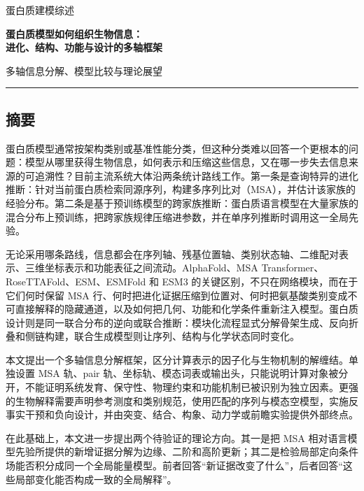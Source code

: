 \documentclass[10pt]{article}
\begin{document}
\begin{titlepage}
\vspace*{25mm}
{\color{gray}\large 蛋白质建模综述\par}
\vspace{16mm}
{\bfseries\fontsize{24}{34}\selectfont
蛋白质模型如何组织生物信息：\\[5mm]
进化、结构、功能与设计的多轴框架\par}
\vspace{13mm}
{\Large 多轴信息分解、模型比较与理论展望\par}
\vfill
\rule{28mm}{1.6pt}
\end{titlepage}
\setcounter{page}{1}


\subsection*{摘要}


蛋白质模型通常按架构类别或基准性能分类，但这种分类难以回答一个更根本的问题：模型从哪里获得生物信息，如何表示和压缩这些信息，又在哪一步失去信息来源的可追溯性？目前主流系统大体沿两条统计路线工作。第一条是查询特异的进化推断：针对当前蛋白质检索同源序列，构建多序列比对（MSA），并估计该家族的经验分布。第二条是基于预训练模型的跨家族推断：蛋白质语言模型在大量家族的混合分布上预训练，把跨家族规律压缩进参数，并在单序列推断时调用这一全局先验。\par

无论采用哪条路线，信息都会在序列轴、残基位置轴、类别状态轴、二维配对表示、三维坐标表示和功能表征之间流动。AlphaFold、MSA Transformer、RoseTTAFold、ESM、ESMFold 和 ESM3 的关键区别，不只在网络模块，而在于它们何时保留 MSA 行、何时把进化证据压缩到位置对、何时把氨基酸类别变成不可直接解释的隐藏通道，以及如何把几何、功能和化学条件重新注入模型。蛋白质设计则是同一联合分布的逆向或联合推断：模块化流程显式分解骨架生成、反向折叠和侧链构建，联合生成模型则让序列、结构与化学状态同时变化。\par

本文提出一个多轴信息分解框架，区分计算表示的因子化与生物机制的解缠结。单独设置 MSA 轨、pair 轨、坐标轨、模态词表或输出头，只能说明计算对象被分开，不能证明系统发育、保守性、物理约束和功能机制已被识别为独立因素。更强的生物解释需要声明参考测度和类别规范，使用匹配的序列与模态空模型，实施反事实干预和负向设计，并由突变、结合、构象、动力学或前瞻实验提供外部终点。\par

在此基础上，本文进一步提出两个待验证的理论方向。其一是把 MSA 相对语言模型先验所提供的新增证据分解为边缘、二阶和高阶更新；其二是检验局部定向条件场能否积分成同一个全局能量模型。前者回答“新证据改变了什么”，后者回答“这些局部变化能否构成一致的全局解释”。\par
\end{document}
